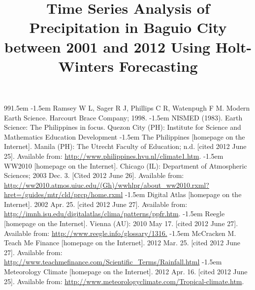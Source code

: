 \documentclass{pshscarc}\usepackage{graphicx, color}
\title{\textbf{Time Series Analysis of Precipitation in Baguio City between 2001 and 2012 Using Holt-Winters Forecasting}}
\begin{document}
\maketitle %
\makePrelim %
\listoflistings






\renewcommand{\bibname}{Cited References}
\def\bibindent{1.5em}
\begin{thebibliography}{99\kern\bibindent}
\makeatletter
\let\old@biblabel\@biblabel
\def\@biblabel#1{\old@biblabel{#1}\kern\bibindent}
\let\old@bibitem\bibitem
\def\bibitem#1{\old@bibitem{#1}\leavevmode\kern-\bibindent}
\renewcommand\@biblabel[1]{}
\setlength{\parskip}{0pt}
\setlength{\itemsep}{0pt plus 0.3ex}
\makeatother
{} Ramsey W L, Sager R J, Phillips C R, Watenpugh F M. Modern Earth Science. Harcourt Brace Company; 1998.
 NISMED (1983). Earth Science: The Philippines in focus. Quezon City (PH): Institute for Science and Mathematics Education Development
 The Philippines [homepage on the Internet]. Manila (PH): The Utrecht Faculty of Education; n.d. [cited 2012 June 25]. Available from: \url{http://www.philippines.hvu.nl/climate1.htm}.
 WW2010 [homepage on the Internet]. Chicago (IL): Department of Atmospheric Sciences; 2003 Dec. 3. [Cited 2012 June 26]. Available from: \url{http://ww2010.atmos.uiuc.edu/(Gh)/wwhlpr/about_ww2010.rxml?hret=/guides/mtr/cld/prcp/home.rxml}
 Digital Atlas [homepage on the Internet]. 2002 Apr. 25. [cited 2012 June 27]. Available from: \url{http://imnh.isu.edu/digitalatlas/clima/patterns/ppfr.htm}.
 Reegle [homepage on the Internet]. Vienna (AU): 2010 May 17. [cited 2012 June 27]. Available from: \url{http://www.reegle.info/glossary/1316.}
 McCracken M. Teach Me Finance [homepage on the Internet]. 2012 Mar. 25. [cited 2012 June 27]. Available from: \url{ http://www.teachmefinance.com/Scientific_Terms/Rainfall.html}
 Meteorology Climate [homepage on the Internet]. 2012 Apr. 16. [cited 2012 June 25]. Available from: \url{http://www.meteorologyclimate.com/Tropical-climate.htm}.

\end{thebibliography}
\end{document}
